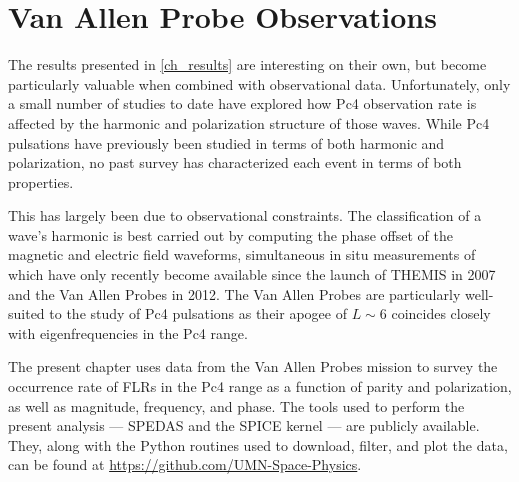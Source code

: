 


\chapter{Van Allen Probe Observations}
  \label{ch_rbsp}

The results presented in \cref{ch_results} are interesting on their own, but
become particularly valuable when combined with observational data.
Unfortunately, only a small number of studies to date have explored how Pc4
observation rate is affected by the harmonic and polarization structure of
those waves. While Pc4 pulsations have previously been studied in terms of both
harmonic\cite{arthur_1981,cummings_1969,engebretson_1988,hughes_1978,
singer_1982,takahashi_1984} and 
polarization\cite{anderson_1990,dai_2015,dai_2013,kokubun_1989,liu_2009}, no
past survey has characterized each event in terms of both properties. 

This has largely been due to observational constraints. The classification of a
wave's harmonic is best carried out by computing the phase offset of the
magnetic and electric field waveforms, simultaneous in situ measurements of
which have only recently become available since the launch of
THEMIS\cite{angelopoulos_2008} in 2007 and the Van Allen
Probes\cite{stratton_2012} in 2012. The Van Allen Probes are particularly
well-suited to the study of Pc4 pulsations as their apogee of $L \sim 6$
coincides closely with eigenfrequencies in the Pc4 range. 

The present chapter uses data from the Van Allen Probes mission to survey the
occurrence rate of FLRs in the Pc4 range as a function of parity and
polarization, as well as magnitude, frequency, and phase. The tools used to
perform the present analysis --- SPEDAS and the SPICE kernel --- are publicly
available. They, along with the Python routines used to download, filter, and
plot the data, can be found at \url{https://github.com/UMN-Space-Physics}. 



